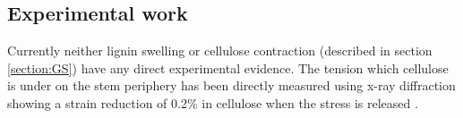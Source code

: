 \subsection{Experimental work}
Currently neither lignin swelling or cellulose contraction (described in section
\ref{section:GS}) have any direct experimental evidence. The tension which cellulose is under
on the stem periphery has been directly measured using x-ray diffraction showing
a strain reduction of 0.2\% in cellulose when the stress is released \citep{Clair_2006}.
